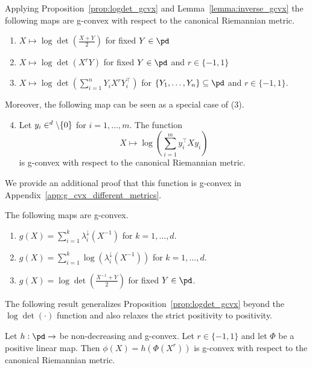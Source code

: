 \documentclass[twoside,11pt]{article}
\begin{document}
\begin{example}
    Applying Proposition~\ref{prop:logdet_gcvx} and Lemma~\ref{lemma:inverse_gcvx} the following maps are g-convex with respect to the canonical Riemannian metric.
    \begin{enumerate}
        \item $X \mapsto \log \det \left(\frac{X+Y}{2}\right)$ for fixed $Y \in \pd$
        \item $X \mapsto \log \det \left(X^{r}Y \right)$ for fixed $Y \in \pd$ and $r \in \{-1, 1\}$
        \item $X \mapsto \log \det \left(\sum_{i=1}^n Y_i X^{r} Y_i^\top \right)$ for $\{Y_1, \ldots, Y_n\} \subseteq \pd$ and $r \in \{-1,1\}$.
    \end{enumerate}
    Moreover, the following map can be seen as a special case of (3). 
    \begin{enumerate}\setcounter{enumi}{3}
        \item Let $y_i \in \real^d \setminus \{0\}$ for $i = 1, \ldots, m$. The function 
        \[
        X \mapsto \log \left(\sum_{i=1}^m y_i^\top X y_i \right)
        \]
        is g-convex with respect to the canonical Riemannian metric.
    \end{enumerate}
    We provide an additional proof that this function is g-convex in Appendix~\ref{app:g_cvx_different_metrics}.
\end{example}
%
\begin{example}
The following maps are g-convex.
    \begin{enumerate}
        \item $g(X) = \sum_{i=1}^k \lambda_i^\downarrow(X^{-1})$ for $k = 1, \ldots, d.$
        \item $g(X) = \sum_{i=1}^k \log\left(\lambda_i^\downarrow(X^{-1})\right)$ for $k = 1, \ldots, d.$
        \item $g(X) = \log \det \left(\frac{X^{-1} + Y}{2}\right)$ for fixed $Y \in \pd$.
    \end{enumerate}
\end{example}
%
The following result generalizes Proposition~\ref{prop:logdet_gcvx} beyond the $\log \det (\cdot)$ function and also relaxes the strict positivity to positivity.
%
\begin{prop}\label{prop:sra_thm15}
Let $h: \pd \to \real$ be non-decreasing and g-convex. Let $r \in \{-1, 1\}$ and let $\Phi$ be a positive linear map. Then $\phi(X) = h\left(\Phi(X^r)\right)$ is g-convex with respect to the canonical Riemannian metric.
\end{prop}
\end{document}
